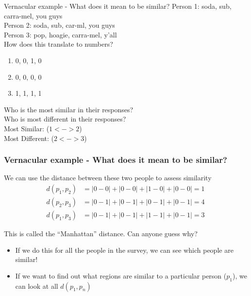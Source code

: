 \documentclass{beamer} %
\newcommand{\1}{\mathbb{1}}
\begin{document}
\begin{frame}[t]{Vernacular example - What does it mean to be similar?}
Person 1: soda, sub, carra-mel, you guys\\
Person 2: soda, sub, car-ml, you guys\\
Person 3: pop, hoagie, carra-mel, y'all\\
\vspace{5 mm}
How does this translate to numbers?
\begin{enumerate}
	\item 0, 0, 1, 0
	\item 0, 0, 0, 0
	\item 1, 1, 1, 1
\end{enumerate}

\vspace{3mm}
Who is the most similar in their responses?\\
Who is most different in their responses?\\

\vspace{3mm}
Most Similar:  ($1 <-> 2$)\\
Most Different:  ($2 <-> 3$)\\

\end{frame}

\begin{frame}\frametitle{Vernacular example - What does it mean to be similar?}
We can use the distance between these two people to assess similarity
\begin{align*}
d(p_1, p_2) &= |0 - 0| + |0 - 0| + |1 - 0| + |0 - 0| = 1\\
d(p_2, p_3) &= |0 - 1| + |0 - 1| + |0 - 1| + |0 - 1| = 4\\
d(p_1, p_3) &= |0 - 1| + |0 - 1| + |1 - 1| + |0 - 1| = 3 \
\end{align*}

This is called the ``Manhattan'' distance. Can anyone guess why?

\vspace{3 mm}
\begin{itemize}
	\item If we do this for all the people in the survey, we can see which people are similar!
	\item If we want to find out what regions are similar to a particular person ($p_1$), we can look at all $d(p_1, p_n)$
\end{itemize} 
\end{frame}
\end{document}
